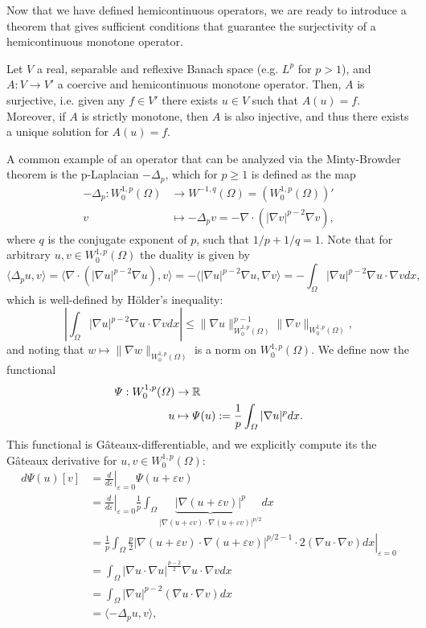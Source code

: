 Now that we have defined hemicontinuous operators, we are ready to introduce a theorem that gives sufficient conditions that guarantee the surjectivity of a hemicontinuous monotone operator.
\begin{theorem}
    Let $V$ a real, separable and reflexive Banach space (e.g. $L^p$ for $p>1$), and $A:V\to V'$ a coercive and hemicontinuous monotone operator. Then, $A$ is surjective, i.e. given any $f\in V'$ there exists $u\in V$ such that $A(u)=f$. Moreover, if $A$ is strictly monotone, then $A$ is also injective, and thus there exists a unique solution for $A(u)=f$.
\end{theorem}
A common example of an operator that can be analyzed via the Minty-Browder theorem is the p-Laplacian $-\Delta_p$, which for $p\geq 1$ is defined as the map
\begin{align*}
    -\Delta_p : W_0^{1,p}(\Omega)&\to W^{-1,q}(\Omega) = (W_0^{1,p}(\Omega))'\\
    v&\mapsto -\Delta_p v = -\nabla\cdot(|\nabla v|^{p-2}\nabla v),
\end{align*}
where $q$ is the conjugate exponent of $p$, such that $1/p + 1/q = 1$. Note that for arbitrary $u,v\in W_0^{1,p}(\Omega)$ the duality is given by 
\begin{equation*}
    \langle \Delta_p u, v\rangle = \langle \nabla\cdot (|\nabla u|^{p-2}\nabla u), v\rangle = -\langle |\nabla u|^{p-2}\nabla u, \nabla v\rangle = -\int_\Omega |\nabla u|^{p-2}\nabla u\cdot\nabla v dx,
\end{equation*}
which is well-defined by Hölder's inequality:
\begin{equation*}
    \left|\int_\Omega |\nabla u|^{p-2}\nabla u\cdot\nabla v dx\right| \leq \|\nabla u\|^{p-1}_{W_0^{1,p}(\Omega)}\|\nabla v\|_{W_0^{1,p}(\Omega)},
\end{equation*}
and noting that $w\mapsto \|\nabla w\|_{W_0^{1,p}(\Omega)}$ is a norm on $W_0^{1,p}(\Omega)$. We define now the functional
\begin{align*}
    \Psi:W_0^{1,p}(\Omega)&\to \mathbb{R}\\
    u&\mapsto \Psi(u):= \frac{1}{p}\int_\Omega |\nabla u|^p dx.
\end{align*}
This functional is Gâteaux-differentiable, and we explicitly compute its the Gâteaux derivative for $u,v\in W_0^{1,p}(\Omega)$:
\begin{align*}
    d\Psi(u)[v] &= \left.\frac{d}{d\varepsilon}\right|_{\varepsilon=0} \Psi(u+\varepsilon v)\\
    &= \left.\frac{d}{d\varepsilon}\right|_{\varepsilon=0} \frac{1}{p}\int_\Omega \underbrace{|\nabla (u+\varepsilon v)|^p}_{|\nabla(u+\varepsilon v)\cdot \nabla(u+\varepsilon v)|^{p/2}} dx\\
    &= \left.\frac{1}{p}\int_\Omega \frac{p}{2} |\nabla (u+\varepsilon v)\cdot\nabla(u+\varepsilon v)|^{p/2-1}\cdot 2(\nabla u\cdot\nabla v) dx\right|_{\varepsilon = 0}\\
    &= \int_\Omega |\nabla u\cdot\nabla u|^{\frac{p-2}{2}}\nabla u\cdot\nabla v dx\\
    &= \int_\Omega |\nabla u|^{p-2}(\nabla u\cdot\nabla v) dx\\
    &= \langle -\Delta_p u, v\rangle,
\end{align*}
